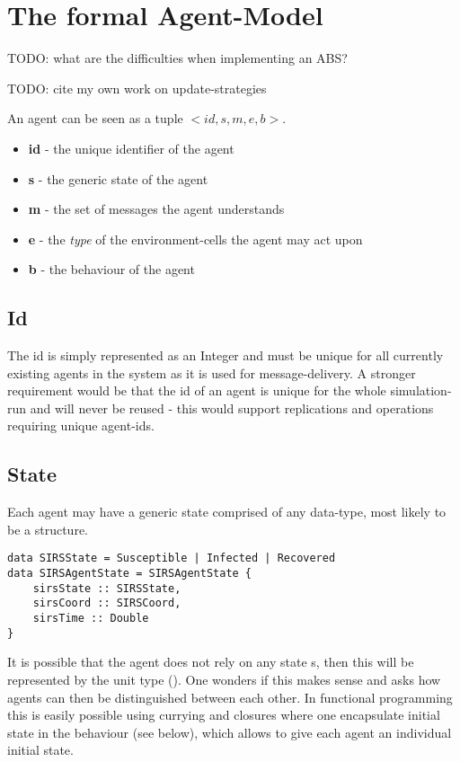 \section{The formal Agent-Model}
TODO: what are the difficulties when implementing an ABS?

TODO: cite my own work on update-strategies

An agent can be seen as a tuple $<id, s, m, e, b>$.
\begin{itemize}
	\item \textbf{id} - the unique identifier of the agent
	\item \textbf{s} - the generic state of the agent
	\item \textbf{m} - the set of messages the agent understands
	\item \textbf{e} - the \textit{type} of the environment-cells the agent may act upon
	\item \textbf{b} - the behaviour of the agent
\end{itemize}

\subsection{Id}
The id is simply represented as an Integer and must be unique for all currently existing agents in the system as it is used for message-delivery. A stronger requirement would be that the id of an agent is unique for the whole simulation-run and will never be reused - this would support replications and operations requiring unique agent-ids.

\subsection{State}
Each agent may have a generic state comprised of any data-type, most likely to be a structure.
\begin{lstlisting}[]
data SIRSState = Susceptible | Infected | Recovered
data SIRSAgentState = SIRSAgentState {
    sirsState :: SIRSState,
    sirsCoord :: SIRSCoord,
    sirsTime :: Double
} 
\end{lstlisting}

It is possible that the agent does not rely on any state s, then this will be represented by the unit type (). One wonders if this makes sense and asks how agents can then be distinguished between each other. In functional programming this is easily possible using currying and closures where one encapsulate initial state in the behaviour (see below), which allows to give each agent an individual initial state.

